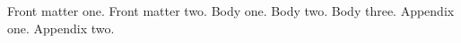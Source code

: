 \documentclass{article}
\begin{document}
Front matter one.\newpage
Front matter two.\newpage
{}
Body one.\newpage
Body two.\newpage
Body three.\newpage
\renewcommand{\thepage}{A-\arabic{page}}
\setcounter{page}{1}
Appendix one.\newpage
Appendix two.
\end{document}
